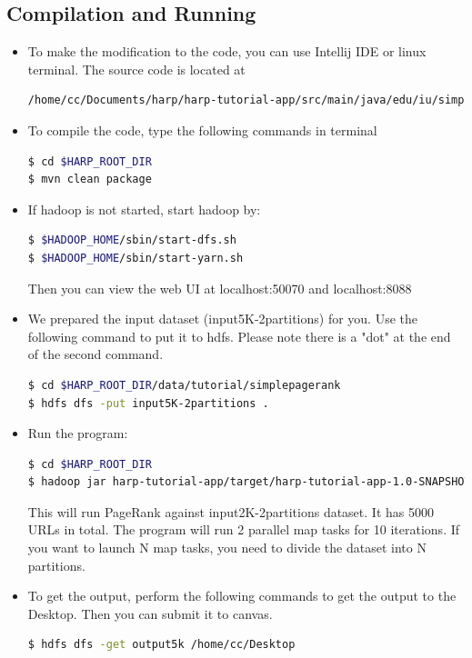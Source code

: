 \subsection*{Compilation and Running}
\begin{itemize}
\item To make the modification to the code, you can use Intellij IDE or linux
  terminal. The source code is located at 
\begin{lstlisting}[language=bash]
/home/cc/Documents/harp/harp-tutorial-app/src/main/java/edu/iu/simplepagerank
\end{lstlisting}
\item To compile the code, type the following commands in terminal
\begin{lstlisting}[language=bash]
$ cd $HARP_ROOT_DIR
$ mvn clean package
\end{lstlisting}

\item If hadoop is not started, start hadoop by:
\begin{lstlisting}[language=bash]
$ $HADOOP_HOME/sbin/start-dfs.sh
$ $HADOOP_HOME/sbin/start-yarn.sh
\end{lstlisting}

Then you can view the web UI at  localhost:50070 and localhost:8088

\item We prepared the input dataset (input5K-2partitions) for you. Use the
  following command to put it to hdfs. Please note there is a "dot" at the end
    of the second command.

\begin{lstlisting}[language=bash]
$ cd $HARP_ROOT_DIR/data/tutorial/simplepagerank
$ hdfs dfs -put input5K-2partitions .
\end{lstlisting}
\item Run the program:
\begin{lstlisting}[language=bash]
$ cd $HARP_ROOT_DIR
$ hadoop jar harp-tutorial-app/target/harp-tutorial-app-1.0-SNAPSHOT.jar edu.iu.simplepagerank.HarpPageRank input5K-2partitions output5k 5000 10
\end{lstlisting}

This will run PageRank against input2K-2partitions dataset. It has 5000 URLs in total. The program will run 2 parallel map tasks for 10 iterations.  If you want to launch N map tasks, you need to divide the dataset into N partitions.

\item To get the output, perform the following commands to get the output to the Desktop. Then you can submit it to canvas.
\begin{lstlisting}[language=bash]
$ hdfs dfs -get output5k /home/cc/Desktop
\end{lstlisting}
\end{itemize}

